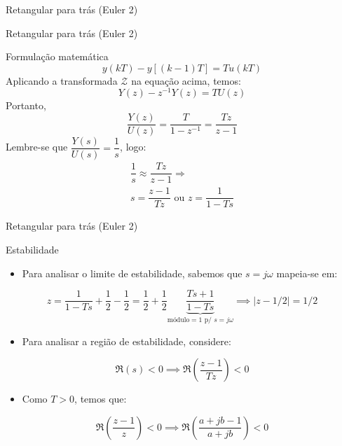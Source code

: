 \begin{frame}{Retangular para trás (Euler 2)}
\centering

\vspace{-2.5cm}

\scalebox{1}{}
\end{frame}


\begin{frame}{Retangular para trás (Euler 2)}
\begin{block}{Formulação matemática}
	\[ y(kT)-y[(k-1)T]=Tu(kT) \]
	Aplicando a transformada $ \mathcal{Z} $ na equação acima, temos:
	\[ Y(z)-z^{-1}Y(z)=TU(z) \]
	Portanto,
	\[ \dfrac{Y(z)}{U(z)}=\dfrac{T}{1-z^{-1}}=\dfrac{Tz}{z-1} \]
	Lembre-se que $ \dfrac{Y(s)}{U(s)}=\dfrac{1}{s} $, logo: \useshortskip
	\begin{gather*}
	\dfrac{1}{s}\approx\dfrac{Tz}{z-1}\Rightarrow\\
	\boxed{s=\dfrac{z-1}{Tz}}\text{ ou }\boxed{z=\dfrac{1}{1-Ts}}
	\end{gather*}
\end{block}
\end{frame}

\begin{frame}{Retangular para trás (Euler 2)}
\begin{block}{Estabilidade}
\begin{itemize}
\item Para analisar o limite de estabilidade, sabemos que $ s=j\omega $ mapeia-se em:
\end{itemize}
 \[ z=\dfrac{1}{1-Ts}+\dfrac{1}{2}-\dfrac{1}{2}=\dfrac{1}{2}+\dfrac{1}{2}\underbrace{\dfrac{Ts+1}{1-Ts}}_{\text{módulo}=1 \text{ p/ }s=j\omega} \implies |z-1/2|=1/2  \]
\begin{itemize}
\item Para analisar a região de estabilidade, considere:
\end{itemize}
$$\Re(s) < 0 \implies \Re \left(\dfrac{z-1}{Tz}\right) < 0$$
\begin{itemize}
\vspace{-0.3cm}
\item[] Como $T > 0$, temos que:
\end{itemize}
$$\Re \left(\dfrac{z-1}{z}\right) < 0 \implies \Re \left(\dfrac{a+jb-1}{a+jb}\right) < 0$$
\end{block}
\end{frame}


